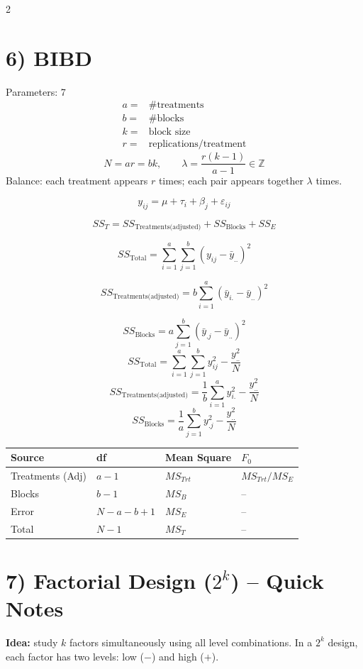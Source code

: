 \documentclass[10pt, letterpaper]{article}
\begin{document}
\begin{multicols}{2}
\section*{6) BIBD}
Parameters:
7\begin{align*}
a=&\#\text{treatments} \\ b=&\#\text{blocks}\\ k=&\text{block size}\\ r=&\text{replications/treatment}
\end{align*}
\[
N=ar=bk,\qquad
\lambda=\frac{r(k-1)}{a-1}\in\mathbb{Z}
\]
Balance: each treatment appears $r$ times; each pair appears together $\lambda$ times.

\[
y_{ij} = \mu + \tau_i + \beta_j + \varepsilon_{ij}
\]

\[
SS_T = SS_{\text{Treatments(adjusted)}} + SS_{\text{Blocks}} + SS_E
\]

\[
SS_{\text{Total}} =
\sum_{i=1}^{a}\sum_{j=1}^{b}(y_{ij}-\bar{y}_{..})^2
\]

\[
SS_{\text{Treatments(adjusted)}} =
b\sum_{i=1}^{a}(\bar{y}_{i.}-\bar{y}_{..})^2
\]

\[
SS_{\text{Blocks}} =
a\sum_{j=1}^{b}(\bar{y}_{.j}-\bar{y}_{..})^2
\]
\[
SS_{\text{Total}} =
\sum_{i=1}^{a}\sum_{j=1}^{b} y_{ij}^2
- \frac{y_{..}^2}{N}
\]
\[
SS_{\text{Treatments(adjusted)}} =
\frac{1}{b}\sum_{i=1}^{a} y_{i.}^2
- \frac{y_{..}^2}{N}
\]
\[
SS_{\text{Blocks}} =
\frac{1}{a}\sum_{j=1}^{b} y_{.j}^2
- \frac{y_{..}^2}{N}
\]
\begin{center}
\footnotesize
\begin{tabular}{llll}
\toprule
Source & df & Mean Square & $F_0$ \\
\midrule
Treatments (Adj) & $a-1$ & $MS_{Trt}$ & $MS_{Trt}/MS_E$ \\
Blocks & $b-1$ & $MS_B$ & -- \\
Error & $N-a-b+1$ & $MS_E$ & -- \\
Total & $N-1$ & $MS_T$ & --\\
\bottomrule
\end{tabular}
\end{center}

\section*{7) Factorial Design ($2^k$) -- Quick Notes}
\textbf{Idea:} study $k$ factors simultaneously using all level combinations.
In a $2^k$ design, each factor has two levels: low ($-$) and high ($+$).


\end{multicols}
\end{document}
